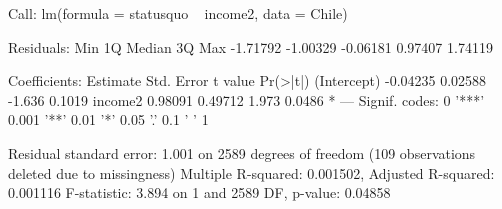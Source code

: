 \begin{Schunk}
\begin{Soutput}
Call:
lm(formula = statusquo ~ income2, data = Chile)

Residuals:
     Min       1Q   Median       3Q      Max 
-1.71792 -1.00329 -0.06181  0.97407  1.74119 

Coefficients:
            Estimate Std. Error t value Pr(>|t|)  
(Intercept) -0.04235    0.02588  -1.636   0.1019  
income2      0.98091    0.49712   1.973   0.0486 *
---
Signif. codes:  0 '***' 0.001 '**' 0.01 '*' 0.05 '.' 0.1 ' ' 1

Residual standard error: 1.001 on 2589 degrees of freedom
  (109 observations deleted due to missingness)
Multiple R-squared:  0.001502,	Adjusted R-squared:  0.001116 
F-statistic: 3.894 on 1 and 2589 DF,  p-value: 0.04858
\end{Soutput}
\end{Schunk}
